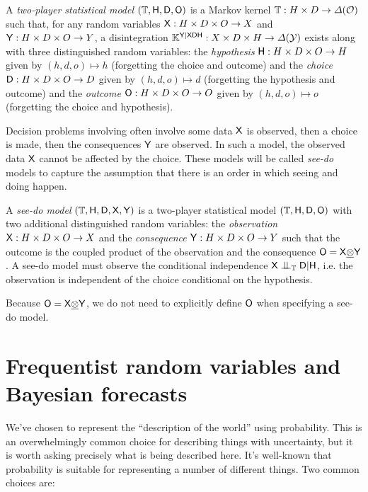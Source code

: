 \begin{definition}\label{def:2p_stat}
A \emph{two-player statistical model} $(\mathbb{T},\mathsf{H},\mathsf{D},\mathsf{O})$ is a Markov kernel $\mathbb{T}:H\times D\to \Delta(\mathcal{O})$ such that, for any random variables $\mathsf{X}: H\times D\times O\to X$ and $\mathsf{Y}:H\times D\times O\to Y$, a disintegration $\mathbb{K}^{\mathsf{Y}|\mathsf{XDH}}:X\times D\times H\to \Delta(\mathcal{Y})$ exists along with three distinguished random variables: the \emph{hypothesis} $\mathsf{H}:H\times D\times O\to H$ given by $(h,d,o)\mapsto h$ (forgetting the choice and outcome) and the \emph{choice} $\mathsf{D}:H\times D\times O\to D$ given by $(h,d,o)\mapsto d$ (forgetting the hypothesis and outcome) and the \emph{outcome} $\mathsf{O}:H\times D\times O\to O$ given by $(h,d,o)\mapsto o$ (forgetting the choice and hypothesis).
\end{definition}

Decision problems involving often involve some data $\mathsf{X}$ is observed, then a choice is made, then the consequences $\mathsf{Y}$ are observed. In such a model, the observed data $\mathsf{X}$ cannot be affected by the choice. These models will be called \emph{see-do} models to capture the assumption that there is an order in which seeing and doing happen.

\begin{definition}\label{def:seedo}
A \emph{see-do model} $(\mathbb{T},\mathsf{H},\mathsf{D},\mathsf{X},\mathsf{Y})$ is a two-player statistical model $(\mathbb{T},\mathsf{H},\mathsf{D},\mathsf{O})$ with two additional distinguished random variables: the \emph{observation} $\mathsf{X}: H\times D\times O\to X$ and the \emph{consequence} $\mathsf{Y}:H\times D\times O\to Y$ such that the outcome is the coupled product of the observation and the consequence $\mathsf{O}=\mathsf{X}\underline{\otimes}\mathsf{Y}$. A see-do model must observe the conditional independence $\RV{X}\CI_\kernel{T} \RV{D}|\RV{H}$, i.e. the observation is independent of the choice conditional on the hypothesis.

Because $\mathsf{O}=\mathsf{X}\underline{\otimes} \mathsf{Y}$, we do not need to explicitly define $\mathsf{O}$ when specifying a see-do model.
\end{definition}


\section{Frequentist random variables and Bayesian forecasts}

We've chosen to represent the ``description of the world'' using probability. This is an overwhelmingly common choice for describing things with uncertainty, but it is worth asking precisely what is being described here. It's well-known that probability is suitable for representing a number of different things. Two common choices are:

